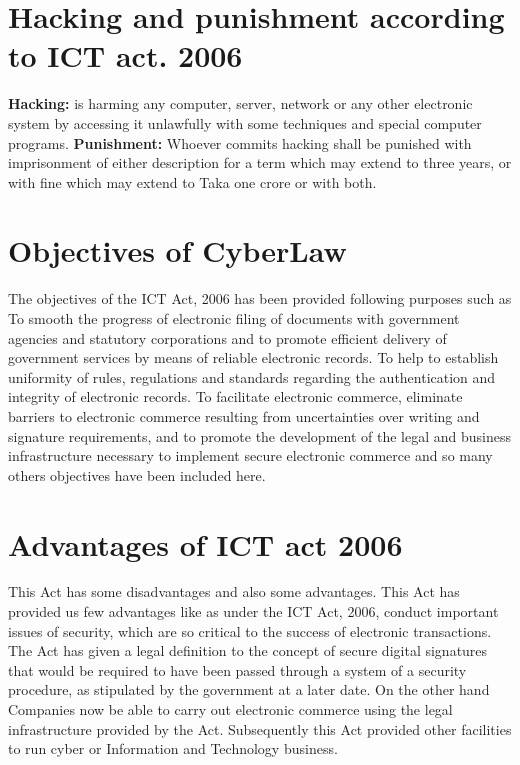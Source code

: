 \documentclass[14 pt, letterpaper]{extarticle}
\begin{document}
	\section{Hacking and punishment according to ICT act. 2006}
	\textbf{Hacking:} is harming any computer, server, network or any other electronic system by accessing it unlawfully with some techniques and special computer programs.
	\textbf{Punishment:} Whoever commits hacking shall be punished with imprisonment of either description for a term which may extend to three years, or with fine which may extend to Taka one crore or with both.
	
	\section{Objectives of CyberLaw}
	The objectives of the ICT Act, 2006 has been provided following purposes such as To smooth the progress of electronic filing of documents with government agencies and statutory corporations and to promote efficient delivery of government services by means of reliable electronic records. To help to establish uniformity of rules, regulations and standards regarding the authentication and integrity of electronic records. To facilitate electronic commerce, eliminate barriers to electronic commerce resulting from uncertainties over writing and signature requirements, and to promote the development of the legal and business infrastructure necessary to implement secure electronic commerce and so many others objectives have been included here.
	
	\section{Advantages of ICT act 2006}
	This Act has some disadvantages and also some advantages. This Act has provided us few advantages like as under the ICT Act, 2006, conduct important issues of security, which are so critical to the success of electronic transactions. The Act has given a legal definition to the concept of secure digital signatures that would be required to have been passed through a system of a security procedure, as stipulated by the government at a later date. On the other hand Companies now be able to carry out electronic commerce using the legal infrastructure provided by the Act. Subsequently this Act provided other facilities to run cyber or Information and Technology business.
	
\end{document}
